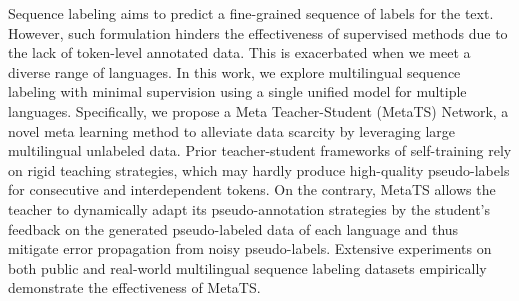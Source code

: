 Sequence labeling aims to predict a fine-grained sequence of labels for the text. However, such formulation hinders the effectiveness of supervised methods due to the lack of token-level annotated data. This is exacerbated when we meet a diverse range of languages. In this work, we explore multilingual sequence labeling with minimal supervision using a single unified model for multiple languages. Specifically, we propose a Meta Teacher-Student (MetaTS) Network, a novel meta learning method to alleviate data scarcity by leveraging large multilingual unlabeled data. Prior teacher-student frameworks of self-training rely on rigid teaching strategies, which may hardly produce high-quality pseudo-labels for consecutive and interdependent tokens. On the contrary, MetaTS allows the teacher to dynamically adapt its pseudo-annotation strategies by the student's feedback on the generated pseudo-labeled data of each language and thus mitigate error propagation from noisy pseudo-labels. Extensive experiments on both public and real-world multilingual sequence labeling datasets empirically demonstrate the effectiveness of MetaTS.
